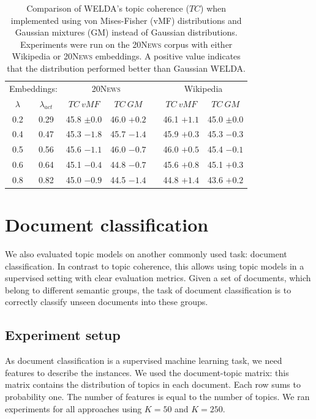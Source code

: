\documentclass[
        a4paper,
        titlepage,
        twoside,
        parskip,
        numbers=noenddot
        ]{scrbook}
\newcommand{\ra}[1]{\renewcommand{\arraystretch}{#1}}
\theoremstyle{break}
\begin{document}
\begin{table}[]
  \ra{1.3}
  \centering
  \caption{Comparison of WELDA's topic coherence ($TC$) when implemented using von Mises-Fisher (vMF) distributions and Gaussian mixtures (GM) instead of Gaussian distributions.
  Experiments were run on the \textsc{20News} corpus with either Wikipedia or \textsc{20News} embeddings.
  A positive value indicates that the distribution performed better than Gaussian WELDA.}
  \label{table:welda_other_distributions}
  \begin{tabular}{@{}ccccccc@{}}
    \toprule
    \multicolumn{2}{r}{Embeddings:} & \multicolumn{2}{c}{\textsc{20News}} && \multicolumn{2}{c}{Wikipedia} \\
    \cmidrule{3-4} \cmidrule{6-7}
    $\lambda$ & $\lambda_{act}$     & $TC~vMF$        & $TC~GM$           && $TC~vMF$       & $TC~GM$      \\
    \midrule
    0.2       & 0.29                & 45.8 $\pm 0.0$  & 46.0 $+0.2$       && 46.1   $+1.1$  & 45.0 $\pm 0.0$ \\
    0.4       & 0.47                & 45.3 $-1.8$     & 45.7 $-1.4$       && 45.9   $+0.3$  & 45.3 $-0.3$     \\
    0.5       & 0.56                & 45.6 $-1.1$     & 46.0 $-0.7$       && 46.0   $+0.5$  & 45.4 $-0.1$     \\
    0.6       & 0.64                & 45.1 $-0.4$     & 44.8 $-0.7$       && 45.6   $+0.8$  & 45.1 $+0.3$     \\
    0.8       & 0.82                & 45.0 $-0.9$     & 44.5 $-1.4$       && 44.8   $+1.4$  & 43.6 $+0.2$     \\ \bottomrule
  \end{tabular}
\end{table}


\section{Document classification}
We also evaluated topic models on another commonly used task: document classification.
In contrast to topic coherence, this allows using topic models in a supervised setting with clear evaluation metrics.
Given a set of documents, which belong to different semantic groups, the task of document classification is to correctly classify unseen documents into these groups.

\subsection{Experiment setup}
\label{sec:dc_setup}
As document classification is a supervised machine learning task, we need features to describe the instances.
We used the document-topic matrix: this matrix contains the distribution of topics in each document.
Each row sums to probability one.
The number of features is equal to the number of topics.
We ran experiments for all approaches using $K = 50$ and $K = 250$.
\end{document}
